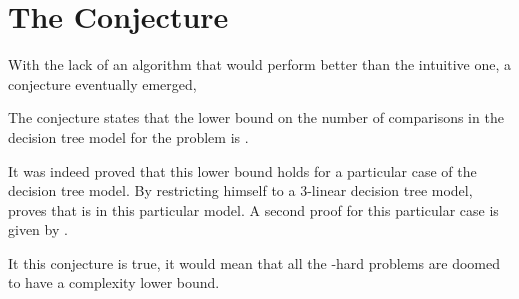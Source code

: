 \section{The Conjecture}

With the lack of an algorithm that would perform better than the intuitive
 one, a conjecture eventually emerged,

\begin{conjecture}
The \threeSUM conjecture states that the lower bound on the number of
comparisons in the decision tree model for the \threeSUM problem
is .
\end{conjecture}

It was indeed proved that this lower bound holds for a particular case of the
decision tree model. By restricting himself to a $3$-linear decision tree
model, \citet{erickson:1999} proves that \threeSUM is  in this
particular model. A second proof for this particular case is given by
\citet{ailon:2005}.

It this conjecture is true, it would mean that all the \threeSUM-hard
problems are doomed to have a  complexity lower bound.
